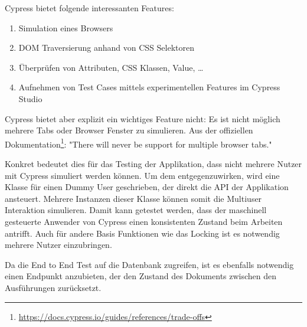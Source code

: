 Cypress bietet folgende interessanten Features:

\begin{enumerate}
    \item Simulation eines Browsers
    \item DOM Traversierung anhand von CSS Selektoren
    \item \"Uberpr\"ufen von Attributen, CSS Klassen, Value, \ldots
    \item Aufnehmen von Test Cases mittels experimentellen Features im Cypress Studio
\end{enumerate}

Cypress bietet aber explizit ein wichtiges Feature nicht: Es ist nicht m\"oglich mehrere Tabs oder Browser Fenster zu simulieren.
Aus der offiziellen Dokumentation\footnote{\href{https://docs.cypress.io/guides/references/trade-offs}{https://docs.cypress.io/guides/references/trade-offs}}: "There will never be support for multiple browser tabs."

Konkret bedeutet dies f\"ur das Testing der Applikation, dass nicht mehrere Nutzer mit Cypress simuliert werden k\"onnen.
Um dem entgegenzuwirken, wird eine Klasse f\"ur einen Dummy User geschrieben, der direkt die API der Applikation ansteuert.
Mehrere Instanzen dieser Klasse k\"onnen somit die Multiuser Interaktion simulieren.
Damit kann getestet werden, dass der maschinell gesteuerte Anwender von Cypress einen konsistenten Zustand beim Arbeiten antrifft.
Auch f\"ur andere Basis Funktionen wie das Locking ist es notwendig mehrere Nutzer einzubringen.

Da die End to End Test auf die Datenbank zugreifen, ist es ebenfalls notwendig einen Endpunkt anzubieten, der den Zustand des Dokuments zwischen den Ausf\"uhrungen zur\"ucksetzt.

